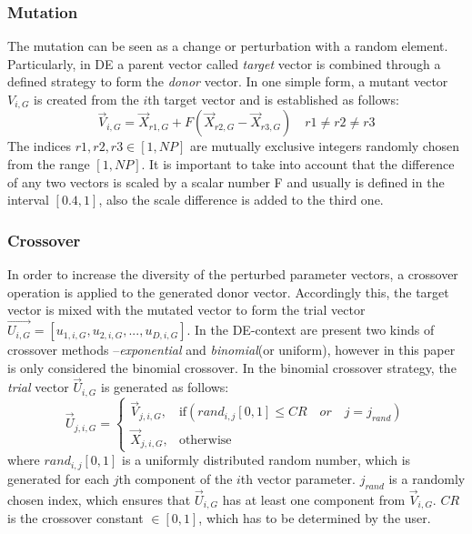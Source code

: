 \subsubsection{Mutation}
The mutation can be seen as a change or perturbation with a random element.
%
Particularly, in DE a parent vector called \textit{target} vector is combined through a defined strategy to form the \textit{donor} vector.
%
In one simple form, a mutant vector $V_{i,G}$ is created from the $i$th target vector and is established as follows:
\begin{equation}\label{eqn:mutation}
\vec{V}_{i,G} = \vec{X}_{r1, G} + F(\vec{X}_{r2, G} - \vec{X}_{r3, G}) \quad r1 \neq r2 \neq r3
\end{equation}
%
The indices $r1, r2, r3 \in [1,NP]$ are mutually exclusive integers randomly chosen from the range $[1, NP]$.
%
It is important to take into account that the difference of any two vectors is scaled by a scalar number F and usually is defined in the interval $[0.4, 1]$, also the scale difference is added to the third one.
%

\subsubsection{Crossover}

In order to increase the diversity of the perturbed parameter vectors, a crossover operation is applied to the generated donor vector.
%
Accordingly this, the target vector is mixed with the mutated vector to form the trial vector $\vec{U_{i,G}} = [u_{1,i,G},u_{2,i,G}, ..., u_{D,i,G} ]$.
%
In the DE-context are present two kinds of crossover methods --\textit{exponential} and \textit{binomial}(or uniform), however in this paper is only considered the binomial crossover.
%
In the binomial crossover strategy, the \textit{trial} vector $\vec{U}_{i,G}$ is generated as follows:
%
\begin{equation} \label{eqn:crossover}
\vec{U}_{j,i,G}= 
\begin{cases}
    \vec{V}_{j,i,G},& \text{if} (rand_{i,j}[0,1] \leq CR \quad or \quad j = j_{rand}  )\\
    \vec{X}_{j,i,G},              & \text{otherwise}
\end{cases}
\end{equation}
where $rand_{i,j}[0,1]$ is a uniformly distributed random number, which is generated for each $j$th component of the $i$th vector parameter.
%
$j_{rand}$ is a randomly chosen index, which ensures that $\vec{U}_{i,G}$ has at least one component from $\vec{V}_{i,G}$.
%
$CR$ is the crossover constant $\in [0,1]$, which has to be determined by the user.


